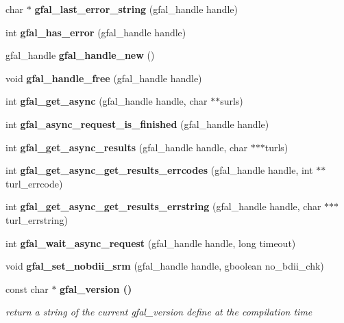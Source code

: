 \begin{CompactItemize}
\item 
char $\ast$ \textbf{gfal\_\-last\_\-error\_\-string} (gfal\_\-handle handle)\label{gfal__common__interface_8h_bdebd69c0c6a74b1b5adf88b5e836d8a}

\item 
int \textbf{gfal\_\-has\_\-error} (gfal\_\-handle handle)\label{gfal__common__interface_8h_ad28f1c5d1a0ed623834e6133bb7dd2e}

\item 
gfal\_\-handle \textbf{gfal\_\-handle\_\-new} ()\label{gfal__common__interface_8h_4211faf02a3c5cc696c7c9f974415d11}

\item 
void \textbf{gfal\_\-handle\_\-free} (gfal\_\-handle handle)\label{gfal__common__interface_8h_0071cb3665f7dca9648fa46bebeca524}

\item 
int \textbf{gfal\_\-get\_\-async} (gfal\_\-handle handle, char $\ast$$\ast$surls)\label{gfal__common__interface_8h_68ef05f37b4971c8306b1cc6ee529647}

\item 
int \textbf{gfal\_\-async\_\-request\_\-is\_\-finished} (gfal\_\-handle handle)\label{gfal__common__interface_8h_ce6fcac8e92ad2e1d699eed2ce74a257}

\item 
int \textbf{gfal\_\-get\_\-async\_\-results} (gfal\_\-handle handle, char $\ast$$\ast$$\ast$turls)\label{gfal__common__interface_8h_0c654545b837b8e1928842ee762ce5e9}

\item 
int \textbf{gfal\_\-get\_\-async\_\-get\_\-results\_\-errcodes} (gfal\_\-handle handle, int $\ast$$\ast$turl\_\-errcode)\label{gfal__common__interface_8h_a3161f12f9d5c8151f44df4f132602cb}

\item 
int \textbf{gfal\_\-get\_\-async\_\-get\_\-results\_\-errstring} (gfal\_\-handle handle, char $\ast$$\ast$$\ast$turl\_\-errstring)\label{gfal__common__interface_8h_ecd7d68b18088ff620d21dbef85862ae}

\item 
int \textbf{gfal\_\-wait\_\-async\_\-request} (gfal\_\-handle handle, long timeout)\label{gfal__common__interface_8h_08c8573e050334d5342a31a48b7db4cb}

\item 
void \textbf{gfal\_\-set\_\-nobdii\_\-srm} (gfal\_\-handle handle, gboolean no\_\-bdii\_\-chk)\label{gfal__common__interface_8h_5e3afd0690b23dedf14d6fa7898f28a9}

\item 
const char $\ast$ \bf{gfal\_\-version} ()
\begin{CompactList}\small\item\em return a string of the current gfal\_\-version define at the compilation time \item\end{CompactList}\end{CompactItemize}


